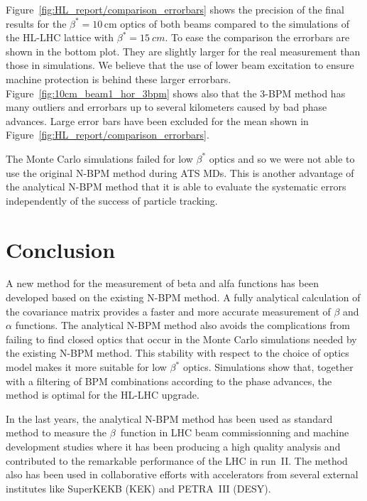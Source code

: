 Figure~\ref{fig:HL_report/comparison_errorbars} shows the precision of the final results for the $ \beta^*=10\,\text{cm} $ optics of both beams compared to the simulations of the HL-LHC lattice with $ \beta^*=\SI{15}{cm} $. To ease the comparison the errorbars are
shown in the bottom plot. They are slightly larger for the real measurement than those in simulations. We believe that the use of lower beam excitation   to ensure machine protection is behind these larger errorbars. Figure~\ref{fig:10cm_beam1_hor_3bpm} shows also that the 3-BPM method has many outliers and errorbars up to several kilometers caused by bad phase advances. Large error bars have been excluded for the mean shown in Figure~\ref{fig:HL_report/comparison_errorbars}.



The Monte Carlo simulations failed for low $ \beta^* $ optics and so we were not able to use the original N-BPM method during ATS MDs. This is another advantage of the analytical N-BPM method that it is
able to evaluate the systematic errors independently of the success of particle tracking.

\section{Conclusion}
\label{sec_nbpm_concl}

A new method for the measurement of beta and alfa functions has been
developed based on the existing N-BPM method.
A fully analytical calculation of the covariance matrix provides a faster and more accurate measurement
of $ \beta  $ and $ \alpha $ functions. The analytical N-BPM method also avoids the complications from
failing to find closed optics that occur in the Monte Carlo simulations  needed by the existing N-BPM method.
This stability with respect to the choice of optics model makes it more suitable for low $ \beta^* $ optics.
Simulations show that, together with a filtering of BPM combinations according to the phase advances,
the method is optimal for the HL-LHC upgrade. 

In the last years, the analytical N-BPM method has been used as standard method to measure the $\beta$~function in LHC
beam commissionning and machine development studies where it has been producing a high quality analysis
and contributed to the remarkable performance of the LHC in run~II.
The method also has been used in collaborative efforts
with accelerators from several external institutes like SuperKEKB (KEK) and PETRA~III (DESY). 
